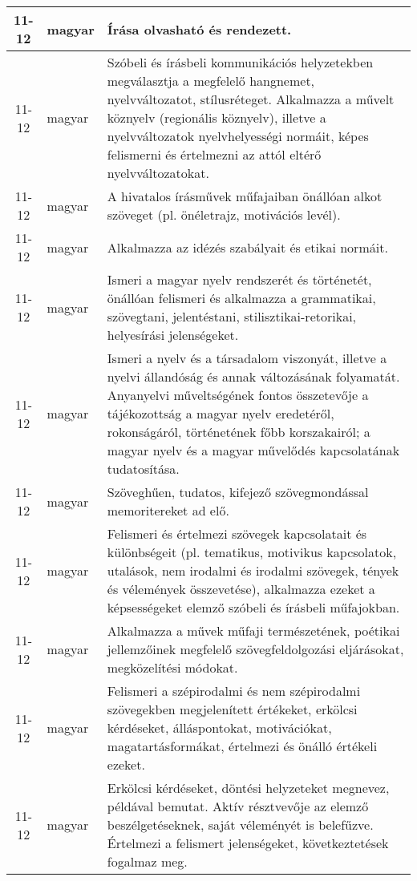 \begin{small}
\begin{longtable}{c | p{2cm} |  p{11cm} }
              11-12 & magyar & Írása olvasható és rendezett. \\ \hline
              11-12 & magyar & Szóbeli és írásbeli kommunikációs helyzetekben megválasztja a megfelelő hangnemet, nyelvváltozatot, stílusréteget. Alkalmazza a művelt köznyelv (regionális köznyelv), illetve a nyelvváltozatok nyelvhelyességi normáit, képes felismerni és értelmezni az attól eltérő nyelvváltozatokat. \\ \hline
              11-12 & magyar & A hivatalos írásművek műfajaiban önállóan alkot szöveget (pl. önéletrajz, motivációs levél). \\ \hline
              11-12 & magyar & Alkalmazza az idézés szabályait és etikai normáit. \\ \hline
              11-12 & magyar & Ismeri a magyar nyelv rendszerét és történetét, önállóan felismeri és alkalmazza a grammatikai, szövegtani, jelentéstani, stilisztikai-retorikai, helyesírási jelenségeket. \\ \hline
              11-12 & magyar & Ismeri a nyelv és a társadalom viszonyát, illetve a nyelvi állandóság és annak változásának folyamatát. Anyanyelvi műveltségének fontos összetevője a tájékozottság a magyar nyelv eredetéről, rokonságáról, történetének főbb korszakairól; a magyar nyelv és a magyar művelődés kapcsolatának tudatosítása. \\ \hline
              11-12 & magyar & Szöveghűen, tudatos, kifejező szövegmondással memoritereket ad elő. \\ \hline
              11-12 & magyar & Felismeri és értelmezi szövegek kapcsolatait és különbségeit (pl. tematikus, motivikus kapcsolatok, utalások, nem irodalmi és irodalmi szövegek, tények és vélemények összevetése), alkalmazza ezeket a képsességeket elemző szóbeli és írásbeli műfajokban. \\ \hline
              11-12 & magyar & Alkalmazza a művek műfaji természetének, poétikai jellemzőinek megfelelő szövegfeldolgozási eljárásokat, megközelítési módokat. \\ \hline
              11-12 & magyar & Felismeri a szépirodalmi és nem szépirodalmi szövegekben megjelenített értékeket, erkölcsi kérdéseket, álláspontokat, motivációkat, magatartásformákat, értelmezi és önálló értékeli ezeket. \\ \hline
              11-12 & magyar & Erkölcsi kérdéseket, döntési helyzeteket megnevez, példával bemutat. Aktív résztvevője az elemző beszélgetéseknek, saját véleményét is belefűzve. Értelmezi a felismert jelenségeket, következtetések fogalmaz meg. \\ \hline

\end{longtable}
\end{small}
